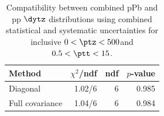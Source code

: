 \begin{table}[htp!]
\centering
\begin{tabular}{|l|r|r|r|}
\hline
Method & $\chi^2$/ndf & ndf & $p$-value \\
\hline
Diagonal & 1.02/6 & 6 & 0.985 \\
Full covariance & 1.04/6 & 6 & 0.984 \\
\hline
\end{tabular}
\caption{Compatibility between combined pPb and pp $\dytz$ distributions using combined statistical and systematic uncertainties for inclusive $0 < \ptz < 500$\GeV and $0.5 < \ptt < 15$\GeV.}
\label{table:chisq_deta}
\end{table}
